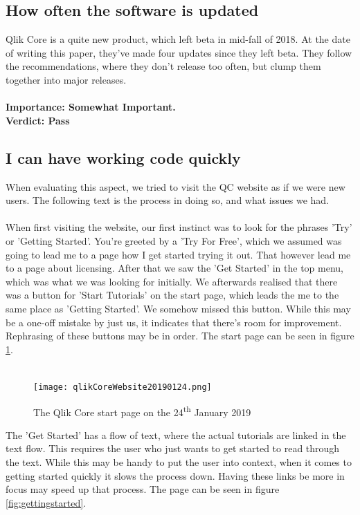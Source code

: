 \documentclass{cslthse-msc}
\begin{document}
    \subsection{How often the software is updated}
    Qlik Core is a quite new product, which left beta in mid-fall of 2018. At the date of writing this paper, they've made four updates since they left beta. They follow the recommendations, where they don't release too often, but clump them together into major releases.\\ \\
    \textbf{Importance: Somewhat Important.}\\
    \textbf{Verdict: Pass}
    \subsection{I can have working code quickly}\label{workincode}
    When evaluating this aspect, we tried to visit the QC website as if we were new users. The following text is the process in doing so, and what issues we had.\\ \\
    When first visiting the website, our first instinct was to look for the phrases 'Try' or 'Getting Started'. You're greeted by a 'Try For Free', which we assumed was going to lead me to a page how I get started trying it out. That however lead me to a page about licensing. After that we saw the 'Get Started' in the top menu, which was what we was looking for initially. We afterwards realised that there was a button for 'Start Tutorials' on the start page, which leads the me to the same place as 'Getting Started'. We somehow missed this button. While this may be a one-off mistake by just us, it indicates that there's room for improvement. Rephrasing of these buttons may be in order. The start page can be seen in figure \ref{fig:startpage}. \\ \\
    \begin{figure}[H]
        \centering
        \texttt{[image: qlikCoreWebsite20190124.png]}
        \caption{The Qlik Core start page on the 24\textsuperscript{th} January 2019}
        \label{fig:startpage}
    \end{figure}
    The 'Get Started' has a flow of text, where the actual tutorials are linked in the text flow. This requires the user who just wants to get started to read through the text. While this may be handy to put the user into context, when it comes to getting started quickly it slows the process down. Having these links be more in focus may speed up that process. The page can be seen in figure \ref{fig:gettingstarted}.
\end{document}
